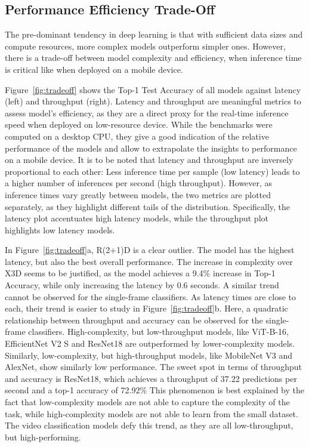 \documentclass[a4paper]{article}
\begin{document}
\subsection{Performance Efficiency Trade-Off} %
\label{sub:tradeoff}

The pre-dominant tendency in deep learning is that with sufficient data sizes
and compute resources, more complex models outperform simpler ones. However,
there is a trade-off between model complexity and efficiency, when inference
time is critical like when deployed on a mobile device. 

Figure~\ref{fig:tradeoff} shows the Top-1 Test Accuracy of all models against
latency (left) and throughput (right). Latency and throughput are meaningful
metrics to assess model's efficiency, as they are a direct proxy for the
real-time inference speed when deployed on low-resource device. While the
benchmarks were computed on a desktop CPU, they give a good indication of the
relative performance of the models and allow to extrapolate the insights to
performance on a mobile device. It is to be noted that latency and throughput
are inversely proportional to each other: Less inference time per sample (low
latency) leads to a higher number of inferences per second (high throughput).
However, as inference times vary greatly between models, the two metrics are
plotted separately, as they highlight different tails of the distribution.
Specifically, the latency plot accentuates high latency models, while the
throughput plot highlights low latency models.

In Figure~\ref{fig:tradeoff}a, R(2+1)D is a clear outlier. The model has the
highest latency, but also the best overall performance. The increase in
complexity over X3D seems to be justified, as the model achieves a 9.4\%
increase in Top-1 Accuracy, while only increasing the latency by 0.6 seconds.
A similar trend cannot be observed for the single-frame classifiers. As
latency times are close to each, their trend is easier to study in
Figure~\ref{fig:tradeoff}b. Here, a quadratic relationship between throughput
and accuracy can be observed for the single-frame classifiers.
High-complexity, but low-throughput models, like ViT-B-16, EfficientNet V2 S
and ResNet18 are outperformed by lower-complexity models. Similarly,
low-complexity, but high-throughput models, like MobileNet V3 and AlexNet,
show similarly low performance. The sweet spot in terms of throughput and
accuracy is ResNet18, which achieves a throughput of 37.22 predictions per
second and a top-1 accuracy of 72.92\% This phenomenon is best explained by
the fact that low-complexity models are not able to capture the complexity of
the task, while high-complexity models are not able to learn from the small
dataset. The video classification models defy this trend, as they are all
low-throughput, but high-performing.
\end{document}
